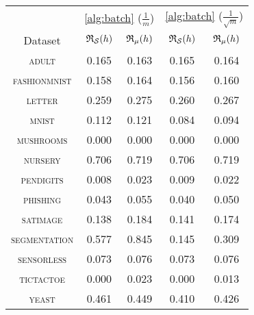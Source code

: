 \begin{tabular}{c|cc|cc}
\toprule
 & \multicolumn{2}{c}{\cref{alg:batch} {\small ($\frac{1}{m}$)}} & \multicolumn{2}{c}{\cref{alg:batch} {\small ($\frac{1}{\sqrt{m}}$)}} \\
Dataset & {\scriptsize $\mathfrak{R}_{\mathcal{S}}(h)$} & {\scriptsize $\mathfrak{R}_{\mu}(h)$} & {\scriptsize $\mathfrak{R}_{\mathcal{S}}(h)$} & {\scriptsize $\mathfrak{R}_{\mu}(h)$} \\
\midrule
\textsc{\footnotesize adult} & 0.165 & 0.163 & 0.165 & 0.164 \\
\textsc{\footnotesize fashionmnist} & 0.158 & 0.164 & 0.156 & 0.160 \\
\textsc{\footnotesize letter} & 0.259 & 0.275 & 0.260 & 0.267 \\
\textsc{\footnotesize mnist} & 0.112 & 0.121 & 0.084 & 0.094 \\
\textsc{\footnotesize mushrooms} & 0.000 & 0.000 & 0.000 & 0.000 \\
\textsc{\footnotesize nursery} & 0.706 & 0.719 & 0.706 & 0.719 \\
\textsc{\footnotesize pendigits} & 0.008 & 0.023 & 0.009 & 0.022 \\
\textsc{\footnotesize phishing} & 0.043 & 0.055 & 0.040 & 0.050 \\
\textsc{\footnotesize satimage} & 0.138 & 0.184 & 0.141 & 0.174 \\
\textsc{\footnotesize segmentation} & 0.577 & 0.845 & 0.145 & 0.309 \\
\textsc{\footnotesize sensorless} & 0.073 & 0.076 & 0.073 & 0.076 \\
\textsc{\footnotesize tictactoe} & 0.000 & 0.023 & 0.000 & 0.013 \\
\textsc{\footnotesize yeast} & 0.461 & 0.449 & 0.410 & 0.426 \\
\bottomrule
\end{tabular}
